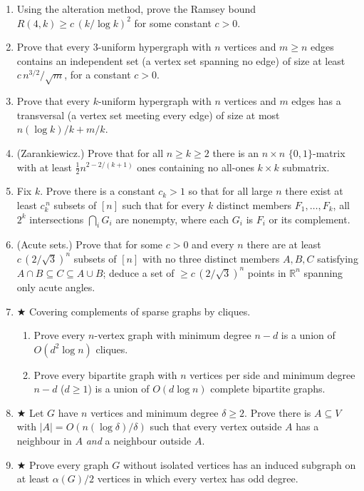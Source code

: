 \begin{enumerate}[itemsep=4pt]
  \item Using the alteration method, prove the Ramsey bound
        $R(4,k)\ge c\,(k/\log k)^2$ for some constant $c>0$.
  \item Prove that every $3$-uniform hypergraph with $n$ vertices and $m\ge n$
        edges contains an independent set (a vertex set spanning no edge) of size
        at least $c\,n^{3/2}/\sqrt m$, for a constant $c>0$.
  \item Prove that every $k$-uniform hypergraph with $n$ vertices and $m$ edges
        has a transversal (a vertex set meeting every edge) of size at most
        $n(\log k)/k+m/k$.
  \item (Zarankiewicz.) Prove that for all $n\ge k\ge2$ there is an $n\times n$
        $\{0,1\}$-matrix with at least $\tfrac12 n^{2-2/(k+1)}$ ones containing no
        all-ones $k\times k$ submatrix.
  \item Fix $k$. Prove there is a constant $c_k>1$ so that for all large $n$
        there exist at least $c_k^{\,n}$ subsets of $[n]$ such that for every $k$
        distinct members $F_1,\dots,F_k$, all $2^k$ intersections
        $\bigcap_i G_i$ are nonempty, where each $G_i$ is $F_i$ or its complement.
  \item (Acute sets.) Prove that for some $c>0$ and every $n$ there are at least
        $c\,(2/\sqrt3)^n$ subsets of $[n]$ with no three distinct members
        $A,B,C$ satisfying $A\cap B\subseteq C\subseteq A\cup B$; deduce a set of
        $\ge c\,(2/\sqrt3)^n$ points in $\mathbb R^n$ spanning only acute angles.
  \item $\bigstar$ Covering complements of sparse graphs by cliques.
        \begin{enumerate}
          \item Prove every $n$-vertex graph with minimum degree $n-d$ is a union
                of $O(d^2\log n)$ cliques.
          \item Prove every bipartite graph with $n$ vertices per side and minimum
                degree $n-d$ ($d\ge1$) is a union of $O(d\log n)$ complete
                bipartite graphs.
        \end{enumerate}
  \item $\bigstar$ Let $G$ have $n$ vertices and minimum degree $\delta\ge2$.
        Prove there is $A\subseteq V$ with $|A|=O(n(\log\delta)/\delta)$ such that
        every vertex outside $A$ has a neighbour in $A$ \emph{and} a neighbour
        outside $A$.
  \item $\bigstar$ Prove every graph $G$ without isolated vertices has an induced
        subgraph on at least $\alpha(G)/2$ vertices in which every vertex has odd
        degree.
\end{enumerate}
